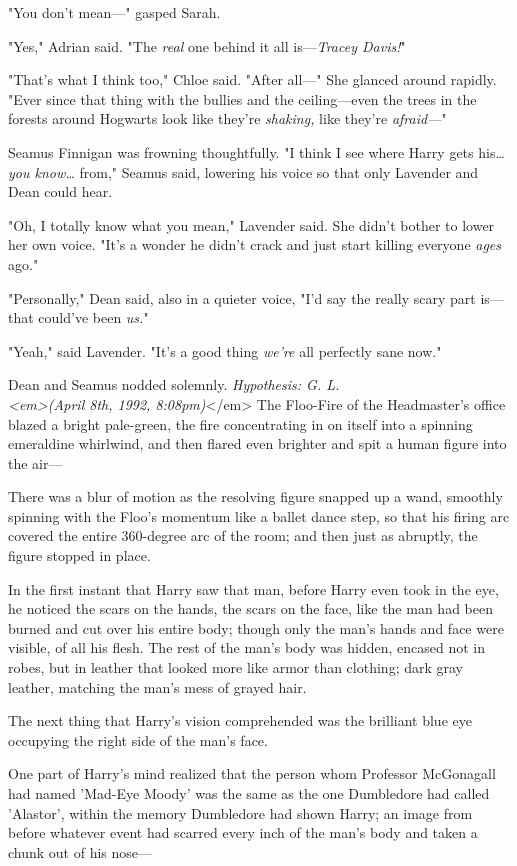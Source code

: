 "You don't mean---" gasped Sarah.

"Yes," Adrian said. "The \emph{real} one behind it all is---\emph{Tracey Davis!}"

"That's what I think too," Chloe said. "After all---" She glanced around rapidly. "Ever since that thing with the bullies and the ceiling---even the trees in the forests around Hogwarts look like they're \emph{shaking,} like they're \emph{afraid---}"

Seamus Finnigan was frowning thoughtfully. "I think I see where Harry gets his{\ldots} \emph{you know{\ldots}} from," Seamus said, lowering his voice so that only Lavender and Dean could hear.

"Oh, I totally know what you mean," Lavender said. She didn't bother to lower her own voice. "It's a wonder he didn't crack and just start killing everyone \emph{ages} ago."

"Personally," Dean said, also in a quieter voice, "I'd say the really scary part is---that could've been \emph{us.}"

"Yeah," said Lavender. "It's a good thing \emph{we're} all perfectly sane now."

Dean and Seamus nodded solemnly.
\sbreak
\emph{Hypothesis: G. L.\\
<em>(April 8th, 1992, 8:08pm)}</em>
\sbreak
The Floo-Fire of the Headmaster's office blazed a bright pale-green, the fire concentrating in on itself into a spinning emeraldine whirlwind, and then flared even brighter and spit a human figure into the air---

There was a blur of motion as the resolving figure snapped up a wand, smoothly spinning with the Floo's momentum like a ballet dance step, so that his firing arc covered the entire 360-degree arc of the room; and then just as abruptly, the figure stopped in place.

In the first instant that Harry saw that man, before Harry even took in the eye, he noticed the scars on the hands, the scars on the face, like the man had been burned and cut over his entire body; though only the man's hands and face were visible, of all his flesh. The rest of the man's body was hidden, encased not in robes, but in leather that looked more like armor than clothing; dark gray leather, matching the man's mess of grayed hair.

The next thing that Harry's vision comprehended was the brilliant blue eye occupying the right side of the man's face.

One part of Harry's mind realized that the person whom Professor McGonagall had named 'Mad-Eye Moody' was the same as the one Dumbledore had called 'Alastor', within the memory Dumbledore had shown Harry; an image from before whatever event had scarred every inch of the man's body and taken a chunk out of his nose---

